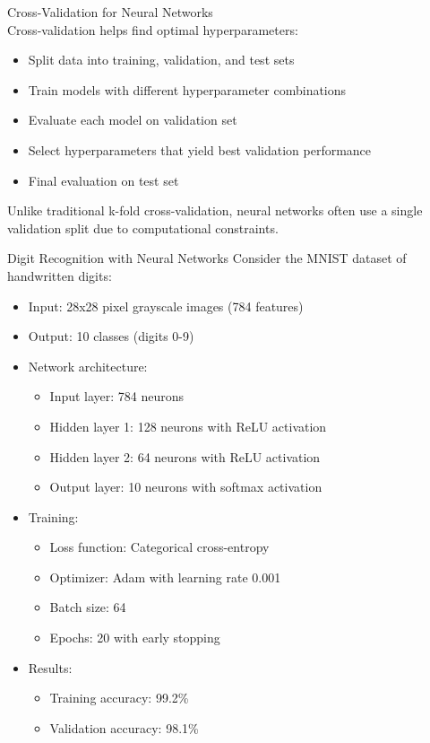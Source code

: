 \begin{concept}{Cross-Validation for Neural Networks}\\
Cross-validation helps find optimal hyperparameters:
\begin{itemize}
    \item Split data into training, validation, and test sets
    \item Train models with different hyperparameter combinations
    \item Evaluate each model on validation set
    \item Select hyperparameters that yield best validation performance
    \item Final evaluation on test set
\end{itemize}
Unlike traditional k-fold cross-validation, neural networks often use a single validation split due to computational constraints.
\end{concept}

\begin{example}{Digit Recognition with Neural Networks}
Consider the MNIST dataset of handwritten digits:
\begin{itemize}
    \item Input: 28x28 pixel grayscale images (784 features)
    \item Output: 10 classes (digits 0-9)
    \item Network architecture:
    \begin{itemize}
        \item Input layer: 784 neurons
        \item Hidden layer 1: 128 neurons with ReLU activation
        \item Hidden layer 2: 64 neurons with ReLU activation
        \item Output layer: 10 neurons with softmax activation
    \end{itemize}
    \item Training:
    \begin{itemize}
        \item Loss function: Categorical cross-entropy
        \item Optimizer: Adam with learning rate 0.001
        \item Batch size: 64
        \item Epochs: 20 with early stopping
    \end{itemize}
    \item Results:
    \begin{itemize}
        \item Training accuracy: 99.2\%
        \item Validation accuracy: 98.1\%
    \end{itemize}
\end{itemize}
\end{example}

